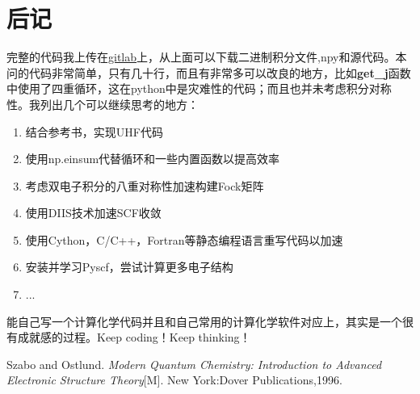 \documentclass[12pt, a4paper, oneside]{ctexart}
\begin{document}
\section{后记}
完整的代码我上传在\href{https://github.com/Yxwxwx/Penglab_tutorial}{gitlab}上，从上面可以下载二进制积分文件,npy和源代码。本问的代码非常简单，只有几十行，而且有非常多可以改良的地方，比如\textbf{get\_j}函数中使用了四重循环，这在python中是灾难性的代码；而且也并未考虑积分对称性。我列出几个可以继续思考的地方：
\begin{enumerate}
	\item 结合参考书，实现UHF代码
	\item 使用np.einsum代替循环和一些内置函数以提高效率
	\item 考虑双电子积分的八重对称性加速构建Fock矩阵
	\item 使用DIIS技术加速SCF收敛
	\item 使用Cython，C/C++，Fortran等静态编程语言重写代码以加速
	\item 安装并学习Pyscf，尝试计算更多电子结构
	\item ...
\end{enumerate}\par
能自己写一个计算化学代码并且和自己常用的计算化学软件对应上，其实是一个很有成就感的过程。Keep coding！Keep thinking！



\newpage
\begin{thebibliography}{99}
    Szabo and Ostlund. \emph{Modern Quantum Chemistry: Introduction to Advanced Electronic Structure Theory}[M]. New York:Dover Publications,1996.
\end{thebibliography}

\newpage
\end{document}
